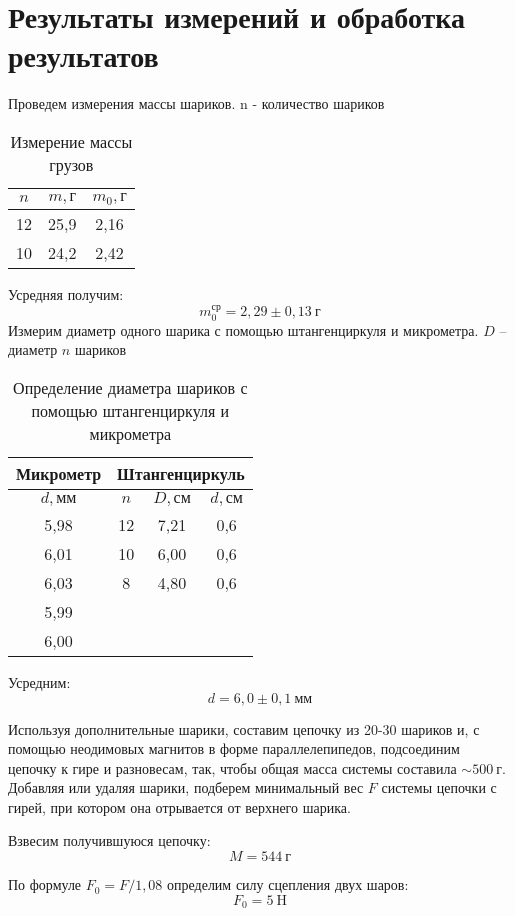 \section{Результаты измерений и обработка результатов}
Проведем измерения массы шариков. n - количество шариков
\begin{table}[H]
\centering
\begin{tabular}{|c|c|c|}
\hline
$n$  & $m, \text{г}$      & $m_0, \text{г}$  \\ \hline
12 & 25,9 & 2,16 \\ \hline
10 & 24,2   & 2,42 \\ \hline
\end{tabular}
\captionsetup{justification=centering}
\caption{Измерение массы грузов}
\end{table}
Усредняя получим:
\[ m_0^\text{ср} = 2,29 \pm 0,13 \ \text{г}\]
Измерим диаметр одного шарика с помощью штангенциркуля и микрометра. $D$ -- диаметр $n$ шариков
\begin{table}[H]
\centering
\begin{tabular}{|c|c|c|c|}
\hline
Микрометр    & \multicolumn{3}{|c|}{Штангенциркуль} \\ \hline
$d, \text{мм}$    & $n$  & $D, \text{см}$    & $d, \text{см}$   \\ \hline
5,98 & 12 & 7,21 & 0,6 \\ \hline
6,01 & 10 & 6,00    & 0,6 \\ \hline
6,03 & 8  & 4,80  & 0,6 \\ \hline
5,99 & \multicolumn{3}{c}{} \\ \cline{1-1}
6,00    & \multicolumn{3}{c}{} \\ \cline{1-1}
\end{tabular}
\captionsetup{justification=centering}
\caption{Определение диаметра шариков с помощью штангенциркуля и микрометра}
\end{table}
Усредним:
\[d = 6,0 \pm 0,1\ \text{мм}\]

Используя дополнительные шарики, составим цепочку из 20-30 шариков и, с помощью неодимовых магнитов
в форме параллелепипедов, подсоединим цепочку к гире и разновесам, так, чтобы общая масса системы
составила $\sim 500\ \text{г}$. Добавляя или удаляя шарики, подберем минимальный вес $F$ системы цепочки с гирей, при котором она
отрывается от верхнего шарика.

Взвесим получившуюся цепочку:
\[ M = 544\ \text{г}\]

По формуле $F_0 = F/1,08$ определим силу сцепления двух шаров:
\[ F_0 = 5\ \text{H}\]

